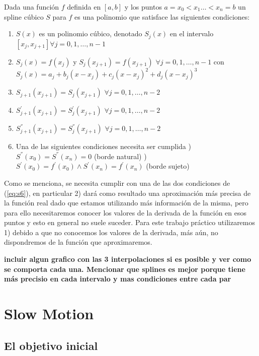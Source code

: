 Dada una función $f$ definida en $[a, b]$ y los puntos $a = x_0 < x_1 \dots < x_n = b$ un spline cúbico $S$ para $f$ es una polinomio que satisface las siguientes condiciones:

\begin{enumerate}
\item $S(x)$ es un polinomio cúbico, denotado $S_j(x)$ en el intervalo $[x_j, x_{j+1}] \forall j = 0, 1, \dots, n-1$ \label{eq:s1}
\item $S_j(x) = f(x_j)$ y $S_j(x_{j+1}) = f(x_{j+1})$ $\forall j = 0, 1, \dots, n-1$ con $S_j(x) = a_j + b_j(x - x_j) + c_j(x - x_j)^2 + d_j(x - x_j)^3$ \label{eq:s2}
\item $S_{j+1}(x_{j+1}) = S_j(x_{j+1})$ $\forall j = 0, 1, \dots, n-2$ \label{eq:s3}
\item $S_{j+1}^{'}(x_{j+1}) = S_j^{'}(x_{j+1})$ $\forall j = 0, 1, \dots, n-2$ \label{eq:s4}
\item $S_{j+1}^{''}(x_{j+1}) = S_j^{''}(x_{j+1})$ $\forall j = 0, 1, \dots, n-2$ \label{eq:s5}
\item Una de las siguientes condiciones necesita ser cumplida \label{eq:s6}
) $S^{''}(x_0) = S^{''}(x_n) = 0$ (borde natural) 
) $S^{'}(x_0) =  f^{'}(x_0) \wedge S^{'}(x_n) = f^{'}(x_n)$ (borde sujeto) 
\end{enumerate}

Como se menciona, se necesita cumplir con una de las dos condiciones de (\ref{eq:s6}), en particular 2) dará como resultado una aproximación más precisa de la función real dado que estamos utilizando más información de la misma, pero para ello necesitaremos conocer los valores de la derivada de la función en esos puntos y esto en general no suele suceder. Para este trabajo práctico utilizaremos 1) debido a que no conocemos los valores de la derivada, más aún, no dispondremos de la función que aproximaremos.

\textbf{incluir algun grafico con las 3 interpolaciones si es posible y ver como se comporta cada una. Mencionar que splines es mejor porque tiene más precisio en cada intervalo y mas condiciones entre cada par}

\section{Slow Motion}

\subsection{El objetivo inicial}


